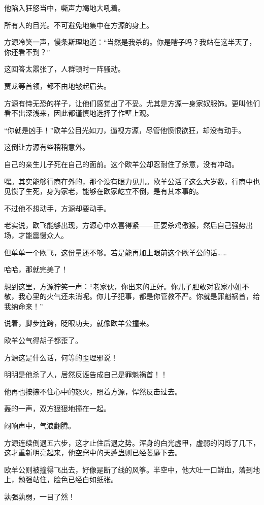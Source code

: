 \begin{this_body}
他陷入狂怒当中，嘶声力竭地大吼着。

所有人的目光。不可避免地集中在方源的身上。

方源冷笑一声，慢条斯理地道：“当然是我杀的。你是瞎子吗？我站在这半天了，你还看不到？”

这回答太嚣张了，人群顿时一阵骚动。

贾龙等首领，都不由地皱起眉头。

方源有恃无恐的样子，让他们感觉出了不妥。尤其是方源一身家奴服饰。更叫他们看不出深浅来，因此都谨慎地选择了作壁上观。

“你就是凶手！”欧羊公目光如刀，逼视方源，尽管他愤恨欲狂，却没有动手。

这倒让方源有些稍稍意外。

自己的亲生儿子死在自己的面前。这个欧羊公却忍耐住了杀意，没有冲动。

嘿。其实能够行商在外的，那个没有眼力见儿。欧羊公活了这么大岁数，行商中也见惯了生死，身为家老，能够在欧家屹立不倒，是有其本事的。

不过他不想动手，方源却要动手。

老实说，欧飞能够出现，方源心中欢喜得紧——正要杀鸡儆猴，然后自己强势出场，才能震慑众人。

但单单一个欧飞，这份量还不够。若是能再加上眼前这个欧羊公的话……

哈哈，那就完美了！

想到这里，方源狞笑一声：“老家伙，你出来的正好。你儿子胆敢对我家小姐不敬，我心里的火气还未消呢。你儿子犯事，都是你管教不严。你就是罪魁祸首，给我纳命来！”

说着，脚步连跨，眨眼功夫，就像欧羊公撞来。

欧羊公气得胡子都歪了。

方源这是什么话，何等的歪理邪说！

明明是他杀了人，居然反诬告成自己是罪魁祸首！！

他再也按捺不住心中的怒火，照着方源，悍然反击过去。

轰的一声，双方狠狠地撞在一起。

闷响声中，气浪翻腾。

方源连续倒退五六步，这才止住后退之势。浑身的白光虚甲，虚弱的闪烁了几下，这才重新明亮起来，他空窍中的天蓬蛊则已经萎靡下去。

欧羊公则被撞得飞出去，好像是断了线的风筝。半空中，他大吐一口鲜血，落到地上，勉强站住，脸色已经白如纸张。

孰强孰弱，一目了然！


\end{this_body}
